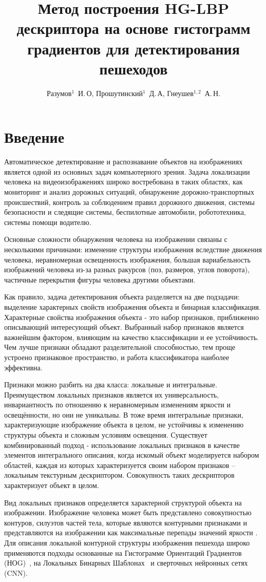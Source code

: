 \documentclass[12pt,twoside]{article}
\title
    [HG-LBP дескриптор на основе гистограмм градиентов для детектирования пешеходов] %
	{Метод построения HG-LBP дескриптора на основе гистограмм градиентов для детектирования пешеходов}
\author
    [Разумов~И.\,О, Прошутинский~Д.\,А, Гнеушев~А.\,Н.] %
    {Разумов$^1$~И.\,О, Прошутинский$^1$~Д.\,А, Гнеушев$^{1,2}$~А.\,Н.} %
    [Разумов$^1$~И.\,О, Прошутинский$^1$~Д.\,А, Гнеушев$^{1,2}$~А.\,Н.] %
\begin{document}
\maketitle
\section{Введение}
Автоматическое детектирование и распознавание объектов на изображениях является одной из основных задач компьютерного зрения. 
Задача локализации человека на видеоизображениях широко востребована в таких областях, как мониторинг и анализ дорожных ситуаций, обнаружение дорожно-транспортных происшествий, контроль за соблюдением правил дорожного движения, системы безопасности и следящие системы, беспилотные автомобили, робототехника, системы помощи водителю.

Основные сложности обнаружения человека на изображении связаны с несколькими причинами: изменение структуры изображения вследствие движения человека, неравномерная освещенность изображения, большая вариабельность изображений человека из-за разных ракурсов (поз, размеров, углов поворота), частичные перекрытия фигуры человека другими объектами.

Как правило, задача детектирования объекта разделяется на две подзадачи: выделение характерных свойств изображения объекта и бинарная классификация. Характерные свойства изображения объекта - это набор признаков, приближенно описывающий интересующий объект. Выбранный набор признаков является важнейшим фактором, влияющим на качество классификации и ее устойчивость. Чем лучше признаки обладают разделительной способностью, тем проще устроено признаковое пространство, и работа классификатора наиболее эффективна. 

Признаки можно разбить на два класса: локальные и интегральные. Преимуществом локальных признаков является их универсальность, инвариантность по отношению к неравномерным изменениям яркости и освещённости, но они не уникальны. В тоже время интегральные признаки, характеризующие изображение объекта в целом, не устойчивы к изменению структуры объекта и сложным условиям освещения. Существует комбинированный подход - использование локальных признаков в качестве элементов интегрального описания, когда искомый объект моделируется набором областей, каждая из которых характеризуется своим набором признаков – локальным текстурным дескриптором. Совокупность таких дескрипторов характеризует объект в целом.

Вид локальных признаков определяется характерной структурой объекта на изображении. Изображение человека может быть представлено совокупностью контуров, силуэтов частей тела, которые являются контурными признаками и представляются на изображении как максимальные перепады значений яркости \cite{Gneushev03}. Для описания локальной контурной структуры изображения пешехода широко применяются подходы основанные на Гистограмме Ориентаций Градиентов (НОG)~\cite{dalaltriggs2005}, на Локальных Бинарных Шаблонах~\cite{dalaltriggs2005} и сверточных нейронных сетях (CNN).
\end{document}
